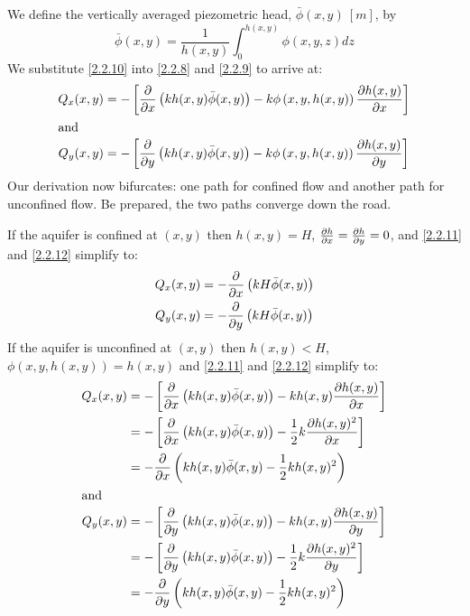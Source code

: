 \documentclass[12pt]{report}
\providecommand{\pderiv}[2]{\frac{\mathinner{\partial#1}}{\mathinner{\partial#2}}}
\begin{document}
We define the vertically averaged piezometric head, $\bar{\phi}(x,y)~[m]$, by
%
\begin{equation}\label{2.2.10}
    \bar{\phi}(x,y) = \frac{1}{h(x,y)} \int_{0}^{h(x,y)} \phi(x,y,z) dz
\end{equation}
%
We substitute \eqref{2.2.10} into \eqref{2.2.8} and \eqref{2.2.9} to arrive at:
%
\begin{align}
    Q_x(x,y) &= -\left[ \pderiv{}{x} \left( k h(x,y) \bar{\phi}(x,y) \right)
        - k\phi\left(x,y,h(x,y) \right) \pderiv{h(x,y)}{x}  \right] \label{2.2.11}\\
        \intertext{and}
    Q_y(x,y) &= -\left[ \pderiv{}{y} \left( k h(x,y) \bar{\phi}(x,y) \right)
        - k\phi\left(x,y,h(x,y) \right) \pderiv{h(x,y)}{y}  \right] \label{2.2.12}
\end{align}
%
Our derivation now bifurcates: one path for confined flow and another path for unconfined flow. Be prepared, the two paths converge down the road.

If the aquifer is confined at $(x,y)$ then $h(x,y) = H$, $\pderiv{h}{x} = \pderiv{h}{y} = 0$, and \eqref{2.2.11} and \eqref{2.2.12} simplify to:
%
\begin{align}
    Q_x(x,y) &= -\pderiv{}{x}\left(kH\bar{\phi}(x,y)\right) \label{2.2.13}\\
    Q_y(x,y) &= -\pderiv{}{y}\left(kH\bar{\phi}(x,y)\right) \label{2.2.14}
\end{align}
%
If the aquifer is unconfined at $(x,y)$ then $h(x,y) < H$, $\phi\left(x,y,h(x,y) \right) = h(x,y)$ and \eqref{2.2.11} and \eqref{2.2.12} simplify to:
%
\begin{align}
    Q_x(x,y)
        &= -\left[ \pderiv{}{x} \left( k h(x,y) \bar{\phi}(x,y) \right) - kh(x,y) \pderiv{h(x,y)}{x}  \right] \label{2.2.15}\\
        &= -\left[ \pderiv{}{x} \left( k h(x,y) \bar{\phi}(x,y) \right) - \frac{1}{2} k \pderiv{h(x,y)^2}{x}  \right] \label{2.2.16}\\
        &= - \pderiv{}{x} \left( k h(x,y) \bar{\phi}(x,y) - \frac{1}{2} k h(x,y)^2 \right) \label{2.2.17}\\
        \intertext{and}
    Q_y(x,y)
        &= -\left[ \pderiv{}{y} \left( k h(x,y) \bar{\phi}(x,y) \right)- kh(x,y) \pderiv{h(x,y)}{y}  \right] \label{2.2.18}\\
        &= -\left[ \pderiv{}{y} \left( k h(x,y) \bar{\phi}(x,y) \right) - \frac{1}{2} k \pderiv{h(x,y)^2}{y}  \right] \label{2.2.19}\\
        &= - \pderiv{}{y} \left( k h(x,y) \bar{\phi}(x,y) - \frac{1}{2} k h(x,y)^2 \right) \label{2.2.20}
\end{align}
\end{document}
